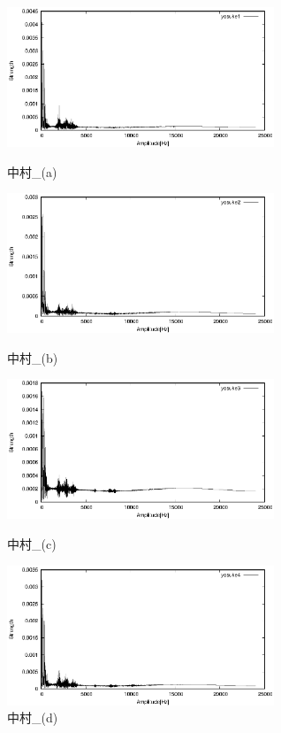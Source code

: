 \documentclass[titlepage]{jarticle}
\begin{document}
\begin{figure}[H]
  \begin{minipage}{0.495\hsize}
    \centering
    \includegraphics[width=8cm]{img/yosuke1.eps}
    \caption{中村\_(a)}
    \label{yosuke1}
  \end{minipage}
  \begin{minipage}{0.495\hsize}
    \centering
    \includegraphics[width=8cm]{img/yosuke2.eps}
    \caption{中村\_(b)}
    \label{yosuke2}
  \end{minipage}


  \begin{minipage}{0.495\hsize}
    \centering
    \includegraphics[width=8cm]{img/yosuke3.eps}
    \caption{中村\_(c)}
    \label{yosuke3}
  \end{minipage}
  \begin{minipage}{0.495\hsize}
    \centering
    \includegraphics[width=8cm]{img/yosuke4.eps}
    \caption{中村\_(d)}
    \label{yosuke4}
  \end{minipage}
\end{figure}
\end{document}
